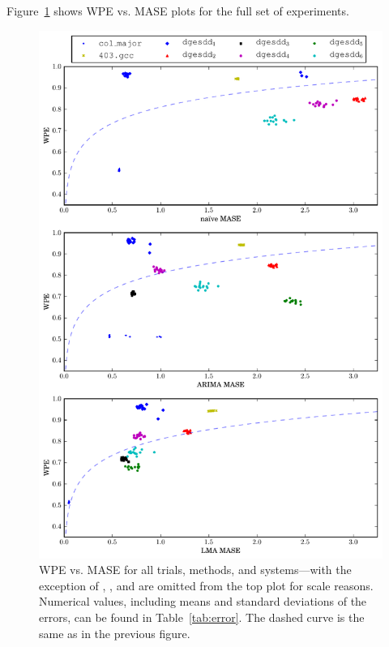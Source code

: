 Figure~\ref{fig:wpe_vs_mase_all} shows WPE vs. MASE plots for the full
set of experiments.
\begin{figure}
  \centering
  \includegraphics[width=\columnwidth]{figs/new_predictions_vs_entropy3}
\caption{WPE vs. MASE for all trials, methods, and systems---with the
  exception of \svdone, \svdthree, and \svdfive are omitted from the
  top plot for scale reasons.
%
%
Numerical values, including means and standard deviations of the
errors, can be found in Table~\ref{tab:error}.  The dashed curve is the
same as in the previous figure.
}
    \label{fig:wpe_vs_mase_all}
\end{figure}
